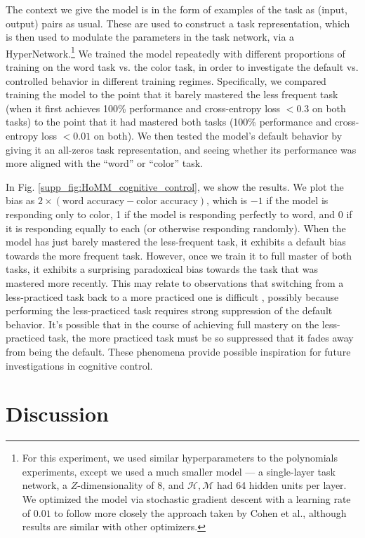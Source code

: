 The context we give the model is in the form of examples of the task as (input, output) pairs as usual. These are used to construct a task representation, which is then used to modulate the parameters in the task network, via a HyperNetwork.\footnote{For this experiment, we used similar hyperparameters to the polynomials experiments, except we used a much smaller model --- a single-layer task network, a $Z$-dimensionality of 8, and $\mathcal{H}, \mathcal{M}$ had 64 hidden units per layer. We optimized the model via stochastic gradient descent with a learning rate of \(0.01\) to follow more closely the approach taken by Cohen et al., although results are similar with other optimizers.} We trained the model repeatedly with different proportions of training on the word task vs. the color task, in order to investigate the default vs. controlled behavior in different training regimes. Specifically, we compared training the model to the point that it barely mastered the less frequent task (when it first achieves 100\% performance and cross-entropy loss \(< 0.3\) on both tasks) to the point that it had mastered both tasks (100\% performance and cross-entropy loss \(<0.01\) on both). We then tested the model's default behavior by giving it an all-zeros task representation, and seeing whether its performance was more aligned with the ``word'' or ``color'' task.

In Fig. \ref{supp_fig:HoMM_cognitive_control}, we show the results. We plot the bias as \(2 \times (\text{word accuracy} - \text{color accuracy})\), which is \(-1\) if the model is responding only to color, 1 if the model is responding perfectly to word, and 0 if it is responding equally to each (or otherwise responding randomly). When the model has just barely mastered the less-frequent task, it exhibits a default bias towards the more frequent task. However, once we train it to full master of both tasks, it exhibits a surprising paradoxical bias towards the task that was mastered more recently. This may relate to observations that switching from a less-practiced task back to a more practiced one is difficult \citep{Monsell2003}, possibly because performing the less-practiced task requires strong suppression of the default behavior. It's possible that in the course of achieving full mastery on the less-practiced task, the more practiced task must be so suppressed that it fades away from being the default. These phenomena provide possible inspiration for future investigations in cognitive control.


\section{Discussion}\label{sec:HoMM:discussion}

